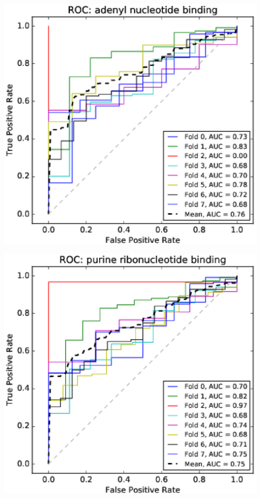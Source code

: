 \documentclass[11pt,twoside,a4paper]{book}
\newenvironment{Figure}
  {\par\medskip\noindent\minipage{\linewidth}}
  {\endminipage\par\medskip}
\begin{document}
\begin{multicols}{2}
\begin{Figure}\begin{center}\includegraphics[width=\linewidth]{figures/roc_adenyl_nucleotide_binding}\label{fig:roc_adenyl_nucleotide_binding}\end{center}\end{Figure}
\begin{Figure}\begin{center}\includegraphics[width=\linewidth]{figures/roc_purine_ribonucleotide_binding}\label{fig:roc_purine_ribonucleotide_binding}\end{center}\end{Figure}

\end{multicols}
\end{document}
